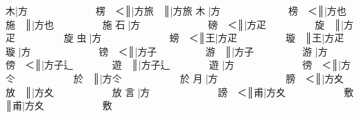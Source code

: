 {\cjk{}{\cnsym{}　　　　}木}|{\cjk{}方{\cnsym{}　　　　　　　}楞{\cnsym{}　}＜}║{\cjk{}{\cnsym{}　　　　　　　}}|{\cjk{}方旅{\cnsym{}　}}║{\cjk{}{\cnsym{}　　　　　　　　}}|{\cjk{}方旅} 
{\cjk{}{\cnsym{}　　　　}木{\cnjzr{}}}|{\cjk{}方{\cnsym{}　　　　　　　}榜{\cnsym{}　}＜}║{\cjk{}{\cnsym{}　　　　　　　}}|{\cjk{}方也{\cnsym{}　　　　　}施{\cnsym{}　}}║{\cjk{}{\cnsym{}　　　　　　　　}}|{\cjk{}方也{\cnsym{}　　　　　}施} 
{\cjk{}{\cnsym{}　　　　}石{\cnjzr{}}}|{\cjk{}方{\cnsym{}　　　　　　　}磅{\cnsym{}　}＜}║{\cjk{}{\cnsym{}　　　　　　　}}|{\cjk{}方疋{\cnsym{}　　　　　}旋{\cnsym{}　}}║{\cjk{}{\cnsym{}　　　　　　　　}}|{\cjk{}方疋{\cnsym{}　　　　　}旋} 
{\cjk{}{\cnsym{}　　　　}虫{\cnjzr{}}}|{\cjk{}方{\cnsym{}　　　　　　　}螃{\cnsym{}　}＜}║{\cjk{}{\cnsym{}　　　　　　}王}|{\cjk{}方疋{\cnsym{}　　　　　}璇{\cnsym{}　}}║{\cjk{}{\cnsym{}　　　　　　　}王}|{\cjk{}方疋{\cnsym{}　　　　　}璇} 
{\cjk{}{\cnsym{}　　　　}}|{\cjk{}方{\cnsym{}　　　　　　　}镑{\cnsym{}　}＜}║{\cjk{}{\cnsym{}　　　　　　}}|{\cjk{}方子{\cnsym{}　　　　　}游{\cnsym{}　}}║{\cjk{}{\cnsym{}　　　　　　　}}|{\cjk{}方子{\cnsym{}　　　　　}游} 
{\cjk{}{\cnsym{}　　　　}}|{\cjk{}方{\cnsym{}　　　　　　　}傍{\cnsym{}　}＜}║{\cjk{}{\cnsym{}　　　　　　　}}|{\cjk{}方子辶{\cnsym{}　　　　}遊{\cnsym{}　}}║{\cjk{}{\cnsym{}　　　　　　　　}}|{\cjk{}方子辶{\cnsym{}　　　　}遊} 
{\cjk{}{\cnsym{}　　　　}}|{\cjk{}方{\cnsym{}　　　　　　　}徬{\cnsym{}　}＜}║{\cjk{}{\cnsym{}　　　　　　　}}|{\cjk{}方仒{\cnsym{}　　　　　　}於{\cnsym{}　}}║{\cjk{}{\cnsym{}　　　　　　　　}}|{\cjk{}方仒{\cnsym{}　　　　　　}於} 
{\cjk{}{\cnsym{}　　　　}月{\cnjzr{}}}|{\cjk{}方{\cnsym{}　　　　　　　}膀{\cnsym{}　}＜}║{\cjk{}{\cnsym{}　　　　　　　}}|{\cjk{}方夊{\cnsym{}　　　　　　}放{\cnsym{}　}}║{\cjk{}{\cnsym{}　　　　　　　　}}|{\cjk{}方夊{\cnsym{}　　　　　　}放} 
{\cjk{}{\cnsym{}　　　　}言{\cnjzr{}}}|{\cjk{}方{\cnsym{}　　　　　　　}謗{\cnsym{}　}＜}║{\cjk{}{\cnsym{}　　　　　　}甫}|{\cjk{}方夊{\cnsym{}　　　　　　}敷{\cnsym{}　}}║{\cjk{}{\cnsym{}　　　　　　　}甫}|{\cjk{}方夊{\cnsym{}　　　　　　}敷} 
